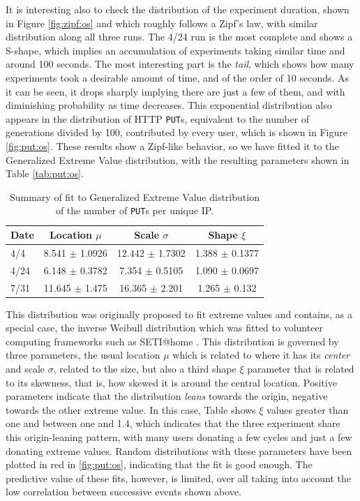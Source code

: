 \documentclass[journal,onecolumn]{IEEEtran}
\begin{document}
It is interesting also to check the distribution of the experiment
duration, shown in Figure \ref{fig:zipf:os} and which roughly follows
a Zipf's law, with similar distribution along all three runs. The 4/24
run is the most complete and shows a S-shape, which implies an
accumulation of experiments taking similar time and around 100
seconds. The most interesting part is the {\em tail}, which shows how
many experiments took a desirable amount of time, and of the order of
10 seconds. As it can be seen, it drops sharply implying there are
just a few of them, and with diminishing probability as time
decreases. This exponential distribution also appears in the
distribution of HTTP {\tt PUT}s, equivalent to the number of
generations divided by 100, contributed by every user, which is shown
in Figure \ref{fig:put:os}. These results show a Zipf-like behavior,
so we have fitted it to the Generalized Extreme Value distribution,
with the resulting parameters shown in Table \ref{tab:put:os}.
%
\begin{table}
\caption{Summary of fit to Generalized Extreme Value distribution of
  the number of {\tt PUT}s per unique IP. \label{tab:puts:os}}
\begin{center}
\begin{tabular}{l|ccc}
\hline
Date  & Location $\mu$ & Scale $\sigma$ & Shape $\xi$ \\
\hline 
4/4 &  8.541 $\pm$ 1.0926  &    12.442 $\pm$ 1.7302 &  1.388 $\pm$
0.1377 \\  
4/24 & 6.148 $\pm$ 0.3782 & 7.354 $\pm$ 0.5105 & 1.090 $\pm$  0.0697  \\    
7/31 & 11.645 $\pm$ 1.475 & 16.365 $\pm$ 2.201 &  1.265 $\pm$ 0.132   \\   
\hline 
\end{tabular}
\end{center}
\end{table}
%
This distribution was originally proposed to fit extreme values
\cite{resnick2013extreme} and contains, as a special case, the inverse
Weibull distribution which was fitted to volunteer computing
frameworks such as SETI@home \cite{javadi2009mining}. This
distribution is governed by three parameters, the usual location $\mu$
which is related to where it has its {\em center} and  scale $\sigma$,
related to the size, but also a third shape $\xi$ parameter that is
related to its skewness, that is, how skewed it is around the central
location. Positive parameters indicate that the distribution {\em
  leans} towards the origin, negative towards the other extreme
value. In this case, Table \cite{tab:puts:os} shows $\xi$ values
greater than one and between one and 1.4, which indicates that the
three experiment share this origin-leaning pattern, with many users
donating a few cycles and just a few donating extreme values. Random
distributions with these parameters have been plotted in red in
\ref{fig:put:os}, indicating that the fit is good enough. The
predictive value of these fits, however, is limited, over all taking
into account the low correlation between successive events shown
above. 
\end{document}
